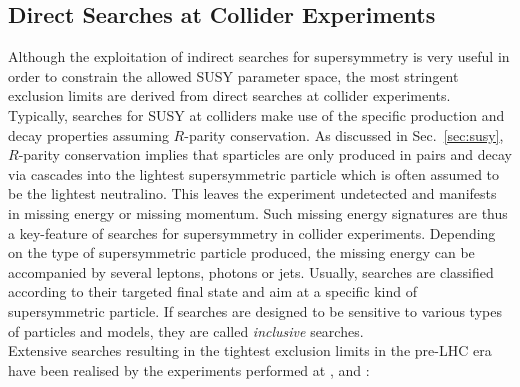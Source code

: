 \subsection{Direct Searches at Collider Experiments}
\label{subsec:susy_collider}
Although the exploitation of indirect searches for supersymmetry is very useful in order to constrain the allowed SUSY parameter space, the most stringent exclusion limits are derived from direct searches at collider experiments. Typically, searches for SUSY at colliders make use of the specific production and decay properties assuming $R$-parity conservation. As discussed in Sec.~\ref{sec:susy}, $R$-parity conservation implies that sparticles are only produced in pairs and decay via cascades into the lightest supersymmetric particle which is often assumed to be the lightest neutralino. This leaves the experiment undetected and manifests in missing energy or missing momentum. Such missing energy signatures are thus a key-feature of searches for supersymmetry in collider experiments. Depending on the type of supersymmetric particle produced, the missing energy can be accompanied by several leptons, photons or jets. Usually, searches are classified according to their targeted final state and aim at a specific kind of supersymmetric particle. If searches are designed to be sensitive to various types of particles and models, they are called \textit{inclusive} searches. \\  
Extensive searches resulting in the tightest exclusion limits in the pre-LHC era have been realised by the experiments performed at \hera, \lep and \tevatron:
